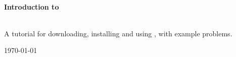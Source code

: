 \begin{titlepage}
\begin{center}



\HRule \\[0.4cm]
{ \huge \bfseries Introduction to \splinter{} \\[0.4cm] }

\HRule \\[1.5cm]

{ \Large A tutorial for downloading, installing and using \splinter{}, with example problems.\\[0.4cm] }


\vfill

{\large \today}

\end{center}
\end{titlepage}

